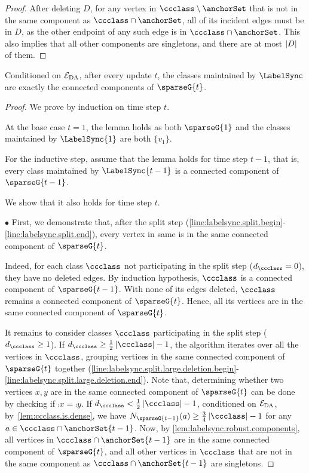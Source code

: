 \begin{proof}
    After deleting $ D $, for any vertex in $ \ccclass \setminus \anchorSet $ that is not in the same component as $ \ccclass \cap \anchorSet $, all of its incident edges must be in $ D $, as the other endpoint of any such edge is in $ \ccclass \cap \anchorSet $.
    This also implies that all other components are singletons, and there are at most $ \left\lvert D \right \rvert $ of them.

\end{proof}
\begin{lemma}
\label{lem:labelsync.classes.are.connected.components}
Conditioned on $ \mathcal{E}_{\rm DA} $, after every update $ t $, the classes maintained by $ \LabelSync $ are exactly the connected components of $ \sparseG{t} $.
\end{lemma}
\begin{proof}
    We prove by induction on time step $ t $.

    At the base case $ t=1 $, the lemma holds as both $ \sparseG{1} $ and the classes maintained by $ \LabelSync{1} $ are both $ \{v_{1}\} $.

    For the inductive step, assume that the lemma holds for time step $ t-1 $, that is, every class maintained by $ \LabelSync{t-1} $ is a connected component of $ \sparseG{t-1} $.

    We show that it also holds for time step $ t $.

    $ \bullet $ First, we demonstrate that, after the split step (\cref{line:labelsync.split.begin}-\cref{line:labelsync.split.end}), every vertex in same \piece{} is in the same connected component of $ \sparseG{t} $. 

    Indeed, for each class $ \ccclass $ not participating in the split step ($ d_{\ccclass} = 0 $), they have no deleted edges.
    By induction hypothesis, $ \ccclass $ is a connected component of $ \sparseG{t-1} $. With none of its edges deleted, $ \ccclass $ remains a connected component of $ \sparseG{t} $.
    Hence, all its vertices are in the same connected component of $ \sparseG{t} $.

    It remains to consider classes $ \ccclass $ participating in the split step ($ d_{\ccclass} \geq 1 $).
    If $ d_{\ccclass} \geq \frac{1}{2}\card{\ccclass}-1 $, the algorithm iterates over all the vertices in $ \ccclass $, grouping vertices in the same connected component of $ \sparseG{t} $ together (\cref{line:labelsync.split.large.deletion.begin}-\cref{line:labelsync.split.large.deletion.end}).
    Note that, determining whether two vertices $ x,y $ are in the same connected component of $ \sparseG{t} $ can be done by checking if $ \comp{x} = \comp{y} $. 
    If $ d_{\ccclass} < \frac{1}{2}\card{\ccclass} - 1 $, conditioned on $ \mathcal{E}_{\rm DA} $, by~\cref{lem:ccclass.is.dense}, we have $ \openN{\sparseG{t-1}}{a} \geq \frac{3}{4}\card{\ccclass}-1 $ for any $ a \in \ccclass \cap \anchorSet{t-1} $.
    Now, by \cref{lem:labelsync.robust.components}, all vertices in $ \ccclass \cap \anchorSet{t-1} $ are in the same connected component of $ \sparseG{t} $, and all other vertices in $ \ccclass $ that are not in the same component as $ \ccclass \cap \anchorSet{t-1} $ are singletons.


\end{proof}
